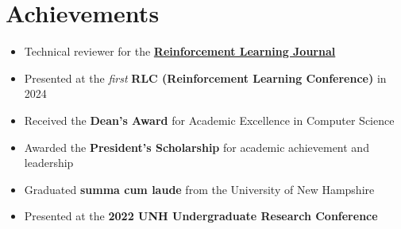 \documentclass[letterpaper,11pt]{article}
\begin{document}
\section{Achievements}
\begin{itemize} %
    \item Technical reviewer for the \href{https://rlj.cs.umass.edu/}{\textbf{Reinforcement Learning Journal}}
    \item Presented at the \emph{first} \textbf{RLC (Reinforcement Learning Conference)} in 2024
    \item Received the \textbf{Dean's Award} for Academic Excellence in Computer Science
    \item Awarded the \textbf{President's Scholarship} for academic achievement and leadership
    \item Graduated \textbf{summa cum laude} from the University of New Hampshire
    \item Presented at the \textbf{2022 UNH Undergraduate Research Conference}
\end{itemize} %
\end{document}
